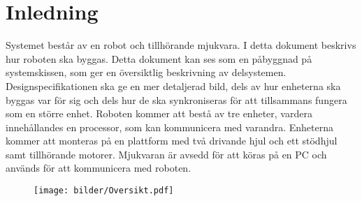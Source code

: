 \section{Inledning}
Systemet består av en robot och tillhörande mjukvara. I detta dokument beskrivs hur roboten ska byggas. Detta dokument kan ses som en påbyggnad på systemskissen, som ger en översiktlig beskrivning av delsystemen. Designspecifikationen ska ge en mer detaljerad bild, dels av hur enheterna ska byggas var för sig och dels hur de ska synkroniseras för att tillsammans fungera som en större enhet.
Roboten kommer att bestå av tre enheter, vardera innehållandes en processor, som kan kommunicera med varandra. 
Enheterna kommer att monteras på en plattform med två drivande hjul och ett stödhjul samt tillhörande motorer.
Mjukvaran är avsedd för att köras på en PC och används för att kommunicera med roboten. 

\begin{figure}[H]
\centering
\texttt{[image: bilder/Oversikt.pdf]}
\end{figure}
